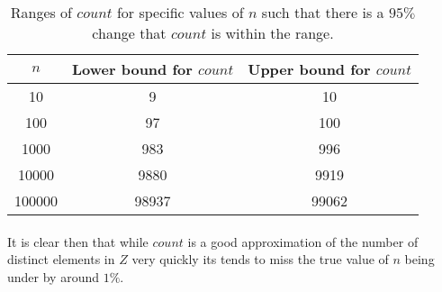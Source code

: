 \documentclass[../main.tex]{subfiles}
\begin{document}
\begin{table}[h!]
  \centering
  \begin{center}
  \begin{tabular}{| c | c | c |}
    \hline
    \(n\) & Lower bound for \(count\) & Upper bound for \(count\) \\ 
    \hline
    10 & 9 & 10 \\ 
    100 & 97 & 100 \\ 
    1000 & 983 & 996 \\ 
    10000 & 9880 & 9919 \\ 
    100000 & 98937 & 99062 \\ 
    \hline
  \end{tabular}
  \end{center}

\caption{Ranges of \(count\) for specific values of \(n\) such that there is a \(95\%\) change that \(count\) is within the range.}
\label{tab:ex1}
\end{table}

\paragraph{} It is clear then that while \(count\) is a good approximation of the number of distinct elements in \(Z\) very quickly its tends to miss the true value of \(n\) being under by around \(1\%\).
\end{document}
